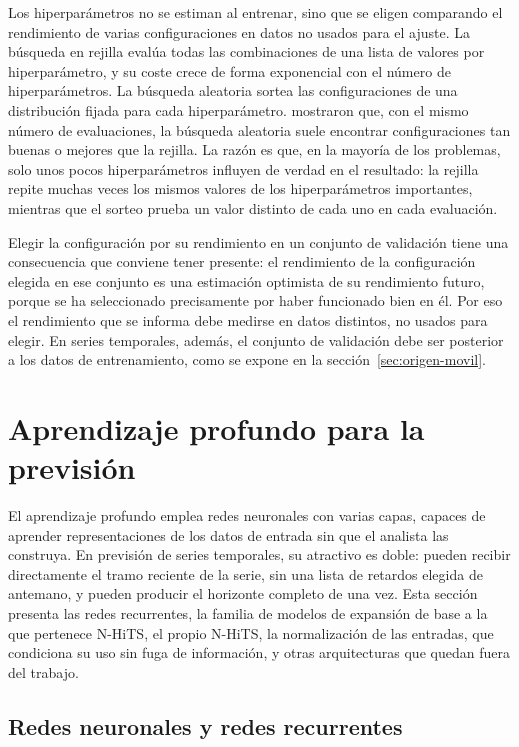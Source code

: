Los hiperparámetros no se estiman al entrenar, sino que se eligen comparando
el rendimiento de varias configuraciones en datos no usados para el ajuste.
La búsqueda en rejilla evalúa todas las combinaciones de una lista de
valores por hiperparámetro, y su coste crece de forma exponencial con el
número de hiperparámetros. La búsqueda aleatoria sortea las configuraciones
de una distribución fijada para cada hiperparámetro.
\textcite{bergstra2012random} mostraron que, con el mismo número de
evaluaciones, la búsqueda aleatoria suele encontrar configuraciones tan
buenas o mejores que la rejilla. La razón es que, en la mayoría de los
problemas, solo unos pocos hiperparámetros influyen de verdad en el
resultado: la rejilla repite muchas veces los mismos valores de los
hiperparámetros importantes, mientras que el sorteo prueba un valor distinto
de cada uno en cada evaluación.

Elegir la configuración por su rendimiento en un conjunto de validación
tiene una consecuencia que conviene tener presente: el rendimiento de la
configuración elegida en ese conjunto es una estimación optimista de su
rendimiento futuro, porque se ha seleccionado precisamente por haber
funcionado bien en él. Por eso el rendimiento que se informa debe medirse en
datos distintos, no usados para elegir. En series temporales, además, el
conjunto de validación debe ser posterior a los datos de entrenamiento, como
se expone en la sección~\ref{sec:origen-movil}.

\section{Aprendizaje profundo para la previsión}\label{sec:dl}

El aprendizaje profundo emplea redes neuronales con varias capas, capaces de
aprender representaciones de los datos de entrada sin que el analista las
construya. En previsión de series temporales, su atractivo es doble: pueden
recibir directamente el tramo reciente de la serie, sin una lista de
retardos elegida de antemano, y pueden producir el horizonte completo de una
vez. Esta sección presenta las redes recurrentes, la familia de modelos de
expansión de base a la que pertenece N-HiTS, el propio N-HiTS, la
normalización de las entradas, que condiciona su uso sin fuga de
información, y otras arquitecturas que quedan fuera del trabajo.

\subsection{Redes neuronales y redes recurrentes}\label{sec:rnn}

